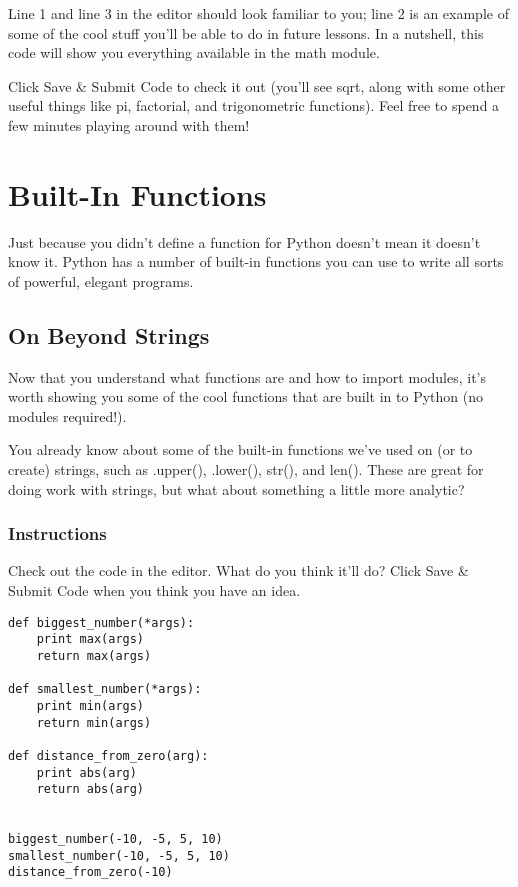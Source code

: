 \documentclass[12pt,a4paper,final,twoside,onecolumn,titlepage]{book}
\begin{document}
Line 1 and line 3 in the editor should look familiar to you; line 2 is an example of some of the cool stuff you'll be able to do in future lessons. In a nutshell, this code will show you everything available in the math module.

Click Save \& Submit Code to check it out (you'll see sqrt, along with some other useful things like pi, factorial, and trigonometric functions). Feel free to spend a few minutes playing around with them!



\section{Built-In Functions}

    Just because you didn't define a function for Python doesn't mean it doesn't know it. Python has a number of built-in functions you can use to write all sorts of powerful, elegant programs.

\subsection{On Beyond Strings}

Now that you understand what functions are and how to import modules, it's worth showing you some of the cool functions that are built in to Python (no modules required!).

You already know about some of the built-in functions we've used on (or to create) strings, such as .upper(), .lower(), str(), and len(). These are great for doing work with strings, but what about something a little more analytic?
\subsubsection{Instructions}

Check out the code in the editor. What do you think it'll do? Click Save \& Submit Code when you think you have an idea.

\begin{lstlisting}
def biggest_number(*args):
    print max(args)
    return max(args)
    
def smallest_number(*args):
    print min(args)
    return min(args)

def distance_from_zero(arg):
    print abs(arg)
    return abs(arg)


biggest_number(-10, -5, 5, 10)
smallest_number(-10, -5, 5, 10)
distance_from_zero(-10)
\end{lstlisting}
\end{document}
